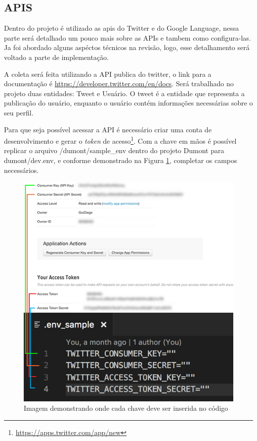 \subsection{APIS}
Dentro do projeto é utilizado as apis do Twitter e do Google Language, nessa parte será detalhado um pouco mais sobre as APIs e tambem como configura-las. Ja foi abordado alguns aspéctos técnicos na revisão, logo, esse detalhamento será voltado a parte de implementação.

A coleta será feita utilizando a API publica do twitter, o link para a documentação é \url{https://developer.twitter.com/en/docs}. Será trabalhado no projeto duas entidades: Tweet e Usuário. O tweet é a entidade que representa a publicação do usuário, enquanto o usuário contém informações necessárias sobre o seu perfil.

Para que seja possível acessar a API é necessário criar uma conta de desenvolvimento e gerar o \textit{token} de acesso\footnote{\url{https://apps.twitter.com/app/new}}. Com a chave em mãos é possível replicar o arquivo /dumont/sample_env dentro do projeto Dumont para dumont/dev.env, e conforme demonstrado na Figura \ref{fig:twitteropts}, completar os campos necessários.

\begin{figure}
    \centering
    \includegraphics[width=.8\textwidth]{imagens/twitteropts.png}
    \caption{Imagem demonstrando onde cada chave deve ser inserida no código}
    \label{fig:twitteropts}
\end{figure}

